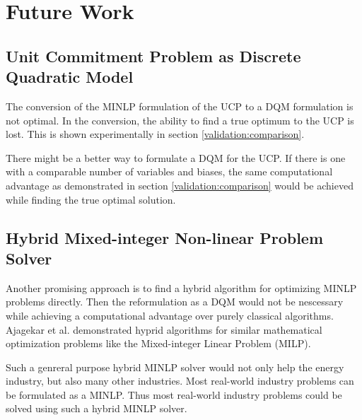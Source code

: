 \section{Future Work}

\subsection{Unit Commitment Problem as Discrete Quadratic Model}

The conversion of the MINLP formulation of the UCP to a DQM formulation is not optimal.
In the conversion, the ability to find a true optimum to the UCP is lost.
This is shown experimentally in section \ref{validation:comparison}.

There might be a better way to formulate a DQM for the UCP.
If there is one with a comparable number of variables and biases, the same computational advantage as demonstrated in section \ref{validation:comparison} would be achieved while finding the true optimal solution.

\subsection{Hybrid Mixed-integer Non-linear Problem Solver}

Another promising approach is to find a hybrid algorithm for optimizing MINLP problems directly.
Then the reformulation as a DQM would not be nescessary while achieving a computational advantage over purely classical algorithms.
Ajagekar et al. \cite{Ajagekar2020} demonstrated hyprid algorithms for similar mathematical optimization problems like the Mixed-integer Linear Problem (MILP).

Such a genreral purpose hybrid MINLP solver would not only help the energy industry, but also many other industries.
Most real-world industry problems can be formulated as a MINLP.
\cite{Belotti2009}
Thus most real-world industry problems could be solved using such a hybrid MINLP solver.
